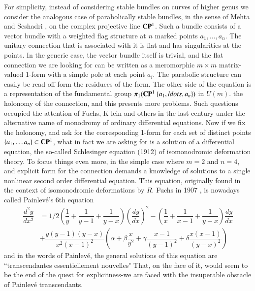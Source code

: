For simplicity, instead of considering stable bundles on curves of higher genus we consider the analogous case of parabolically stable bundles, in the sense of Mehta and Seshadri \cite{art6-key11}, on the complex projective line $\mathbf{C}\mathbf{P}^{1}$. Such a bundle consists of a vector bundle with a weighted flag structure at $n$ marked points
$a_{1}, \ldots, a_{n}$. The unitary connection that is associated with it is flat and has singularities at the points. In the generic case, the vector bundle itself is trivial, and the flat connection we are looking for can be written as a meromorphic $m \times m$ matrix-valued 1-form with a simple pole at each point $a_{i}$. The parabolic structure can easily be read off form the residuces of the form. The other side of the equation is a representation of the fundamental group $\pi_{1}(\bC\bP^{1}\ \{a_{1}, ldots, a_{n}\})$ in $U(m)$. the holonomy of the connection, and this presents more problems. Such questions occupied the attention of Fuchs, K-lein and others in the last century under the alternative name of monodromy of ordinary differential equations. Now if we fix the holonomy, and ask for the corresponding 1-form for each set of distinct points $\{a_{1}, \ldots a_{n}\}\subset \mathbf{C}\mathbf{P}^{1}$, what in fact we are asking for is a solution of a differential equation, the so-called Schlesinger equation (1912) of isomonodromic deformation theory. To focus things even more, in the simple case where $m=2$ and $n =4$, and explicit form for the connection demands a knowledge of solutions to a single nonlinear second order differential equation. This equation, originally found in the context of isomonodromic deformations by $R$. Fuchs in 1907 \cite{art6-key4}, is nowadays called Painlev\'e's 6th equation
\begin{equation*}
\begin{split}
\dfrac{d^{2}y}{dx^{2}} & = 1/2 \left(\dfrac{1}{y} + \dfrac{1}{y-1} + \dfrac{1}{y-x}\right)\left(\dfrac{dy}{dx}\right)^{2} - \left(\dfrac{1}{x} + \dfrac{1}{x-1} + \dfrac{1}{y-x}\right) \dfrac{dy}{dx} \\
 &+ \dfrac{y(y-1)(y-x)}{x^{2}(x-1)^{2}} \left(\alpha + \beta\dfrac{x}{y^{2}} + \gamma\dfrac{x-1}{(y-1)^{2}} + \delta\dfrac{x(x-1)}{(y-x)^{2}}\right)
\end{split}
\end{equation*}
and in the words of Painlev\'e, the general solutions of this equation are ``transcendantes essentiellement nouvelles"  That, on the face of it, would seem to be the end of the quest for explicitness-we are faced with the insuperable obstacle of Painlev\'e transcendants.

